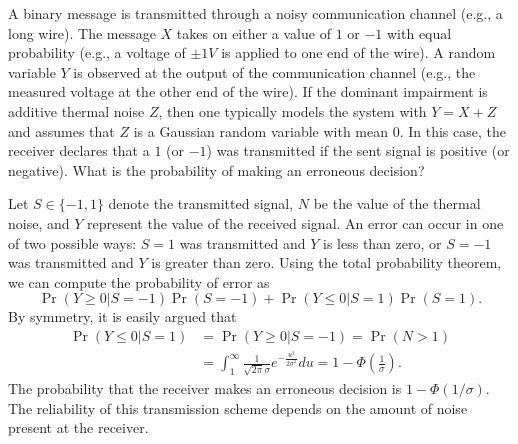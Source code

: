 \begin{example} \label{example:NoiseCommunicationSystem1}
A binary message is transmitted through a noisy communication channel (e.g., a long wire).
The message $X$ takes on either a value of $1$ or $-1$ with equal probability (e.g., a voltage of $\pm 1 V$ is applied to one end of the wire).
A random variable $Y$ is observed at the output of the communication channel (e.g., the measured voltage at the other end of the wire).
If the dominant impairment is additive thermal noise $Z$, then one typically models the system with $Y = X + Z$ and assumes that $Z$ is a Gaussian random variable with mean 0.
In this case, the receiver declares that a $1$ (or $-1$) was transmitted if the sent signal is positive (or negative).
What is the probability of making an erroneous decision?

Let $S \in \{ -1, 1 \}$ denote the transmitted signal, $N$ be the value of the thermal noise, and $Y$ represent the value of the received signal.
An error can occur in one of two possible ways: $S = 1$ was transmitted and $Y$ is less than zero, or $S = -1$ was transmitted and $Y$ is greater than zero.
Using the total probability theorem, we can compute the probability of error as
\begin{equation*}
\Pr (Y \geq 0 | S = -1) \Pr (S = -1)
+ \Pr (Y \leq 0 | S = 1) \Pr (S = 1).
\end{equation*}
By symmetry, it is easily argued that
\begin{equation*}
\begin{split}
\Pr (Y \leq 0 | S = 1) &= \Pr (Y \geq 0 | S = -1) = \Pr (N > 1) \\
&= \int_{1}^{\infty} \frac{1}{\sqrt{2 \pi} \sigma}
e^{- \frac{u^2}{2 \sigma^2}} du
= 1 - \Phi \left( \frac{1}{\sigma} \right) .
\end{split}
\end{equation*}
The probability that the receiver makes an erroneous decision is $1 - \Phi (1/\sigma)$.
The reliability of this transmission scheme depends on the amount of noise present at the receiver.
\end{example}

